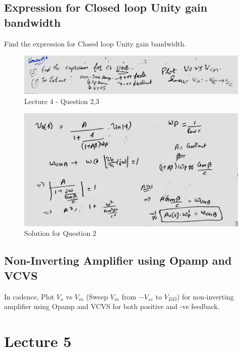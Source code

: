 \documentclass[a4paper]{article}
\begin{document}
\subsection{Expression for Closed loop Unity gain bandwidth}
Find the expression for Closed loop Unity gain bandwidth.
\begin{figure}
    \centering
    \includegraphics[width=0.8\linewidth]{images/Lec_4_Q_2_3.jpeg}
    \caption{Lecture 4 - Question 2,3}
\end{figure}
\begin{figure}
    \centering
    \includegraphics[width=1\linewidth]{images/Lec_4_Q2_Soln.jpeg}
    \caption{Solution for Question 2}
\end{figure}
\subsection{Non-Inverting Amplifier using Opamp and VCVS}
In cadence, Plot $V_o$ vs $V_{in}$ (Sweep $V_{in}$ from $-V_{ss}$ to $V_{DD}$) for non-inverting amplifier using Opamp and VCVS for both positive and -ve feedback.
\section{Lecture 5}
\end{document}
